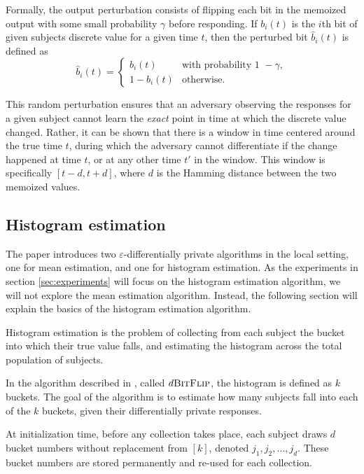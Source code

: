 \documentclass[a4paper,12pt]{article}
\renewcommand{\epsilon}{\varepsilon}
\begin{document}
Formally, the output perturbation consists of flipping each bit in the memoized output with some small probability $\gamma$ before responding. If $b_i(t)$ is the $i$th bit of given subjects discrete value for a given time $t$, then the perturbed bit $\hat{b}_i(t)$ is defined as $$\hat{b}_i(t)=\begin{cases}
b_i(t) & \text{with probability 1 } - \gamma, \\
1 - b_i(t) & \text{otherwise.}
\end{cases}$$

This random perturbation ensures that an adversary observing the responses for a given subject cannot learn the \emph{exact} point in time at which the discrete value changed. Rather, it can be shown \cite[sec.~4]{microsoft_telemetry} that there is a window in time centered around the true time $t$, during which the adversary cannot differentiate if the change happened at time $t$, or at any other time $t'$ in the window. This window is specifically $[t-d, t+d]$, where $d$ is the Hamming distance between the two memoized values.

\subsection{Histogram estimation \label{sec:histogram_algo}}

The paper introduces two $\epsilon$-differentially private algorithms in the local setting, one for mean estimation, and one for histogram estimation. As the experiments in section \ref{sec:experiments} will focus on the histogram estimation algorithm, we will not explore the mean estimation algorithm. Instead, the following section will explain the basics of the histogram estimation algorithm. 

Histogram estimation is the problem of collecting from each subject the bucket into which their true value falls, and estimating the histogram across the total population of subjects.

In the algorithm described in \cite{microsoft_telemetry}, called $d\textsc{BitFlip}$, the histogram is defined as $k$ buckets. The goal of the algorithm is to estimate how many subjects fall into each of the $k$ buckets, given their differentially private responses.

At initialization time, before any collection takes place, each subject draws $d$ bucket numbers without replacement from $[k]$, denoted $j_1,j_2,\dots,j_d$. These bucket numbers are stored permanently and re-used for each collection.
\end{document}
